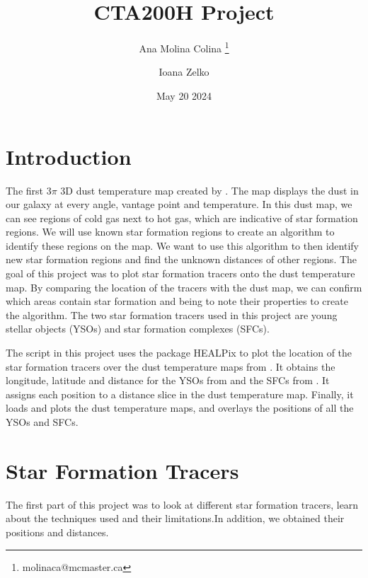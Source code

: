 \documentclass[12pt]{article}
\begin{document}
\title{CTA200H Project}

\author{%
   Ana Molina Colina%
   \thanks{molinaca@mcmaster.ca}%
   \and%
   Ioana Zelko%
}

\date{May 20 2024}

\maketitle

\section{Introduction}

The first 3$\pi$ 3D dust temperature map created by \cite{Zelko2022}. The map displays the dust in our galaxy at every angle, vantage point and temperature. In this dust map, we can see regions of cold gas next to hot gas, which are indicative of star formation regions. We will use known star formation regions to create an algorithm to identify these regions on the map. We want to use this algorithm to then identify new star formation regions and find the unknown distances of other regions. The goal of this project was to plot star formation tracers onto the dust temperature map. By comparing the location of the tracers with the dust map, we can confirm which areas contain star formation and being to note their properties to create the algorithm. The two star formation tracers used in this project are young stellar objects (YSOs) and star formation complexes (SFCs). 

The script in this project uses the package HEALPix to plot the location of the star formation tracers over the dust temperature maps from \cite{Zelko2022}. It obtains the longitude, latitude and distance for the YSOs from \cite{Kuhn2021} and the SFCs from \cite{RahmanMurray2010}. It assigns each position to a distance slice in the dust temperature map. Finally, it loads and plots the dust temperature maps, and overlays the positions of all the YSOs and SFCs. 

\section{Star Formation Tracers}
The first part of this project was to look at different star formation tracers, learn about the techniques used and their limitations.In addition, we obtained their positions and distances. 
\end{document}
